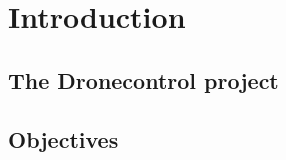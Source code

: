 \cleardoublepage
\chapter{Introduction}
\label{sec:intro}

\section{The Dronecontrol project}




\section{Objectives}
\label{sec:objetives}


